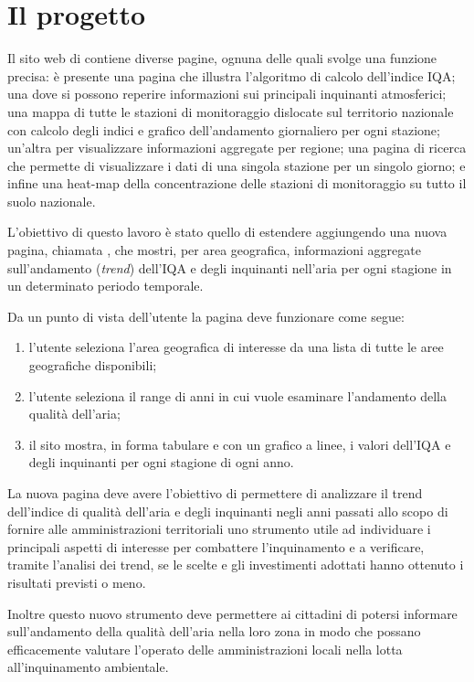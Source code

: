 \chapter{Il progetto}

Il sito web di \MonIQA{} contiene diverse pagine, ognuna delle quali svolge una
funzione precisa: è presente una pagina che illustra l'algoritmo di calcolo
dell'indice IQA; una dove si possono reperire informazioni sui principali
inquinanti atmosferici; una mappa di tutte le stazioni di monitoraggio dislocate
sul territorio nazionale con calcolo degli indici e grafico dell'andamento
giornaliero per ogni stazione; un'altra per visualizzare informazioni aggregate
per regione; una pagina di ricerca che permette di visualizzare i dati di una
singola stazione per un singolo giorno; e infine una heat-map della
concentrazione delle stazioni di monitoraggio su tutto il suolo nazionale.

L'obiettivo di questo lavoro è stato quello di estendere \MonIQA{} aggiungendo
una nuova pagina, chiamata , che mostri, per area
geografica, informazioni aggregate sull'andamento (\textit{trend}) dell'IQA e
degli inquinanti nell'aria per ogni stagione in un determinato periodo
temporale.

Da un punto di vista dell'utente la pagina deve funzionare come segue:
\begin{enumerate}
	\item l'utente seleziona l'area geografica di interesse da una lista di
		tutte le aree geografiche disponibili;
	\item l'utente seleziona il range di anni in cui vuole esaminare
		l'andamento della qualità dell'aria;
	\item il sito mostra, in forma tabulare e con un grafico a linee, i
		valori dell'IQA e degli inquinanti per ogni stagione di ogni
		anno.
\end{enumerate}

La nuova pagina deve avere l'obiettivo di permettere di analizzare il trend
dell'indice di qualità dell'aria e degli inquinanti negli anni passati allo
scopo di fornire alle amministrazioni territoriali uno strumento utile ad
individuare i principali aspetti di interesse per combattere l'inquinamento e a
verificare, tramite l'analisi dei trend, se le scelte e gli investimenti
adottati hanno ottenuto i risultati previsti o meno.

Inoltre questo nuovo strumento deve permettere ai cittadini di potersi informare
sull'andamento della qualità dell'aria nella loro zona in modo che possano
efficacemente valutare l'operato delle amministrazioni locali nella lotta
all'inquinamento ambientale.

